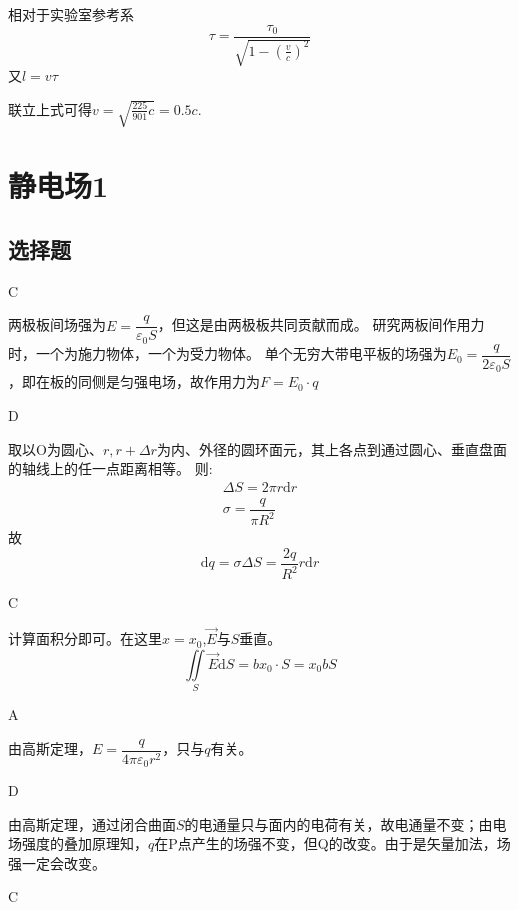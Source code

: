 \documentclass[b5paper,opensource,sourcefont,parskip]{qyxf-book}
\newcommand{\di}[1]{\mathrm{d}#1}
\begin{document}
\solve
相对于实验室参考系
\begin{equation*}
\tau=\frac{\tau_0}{\sqrt{1-(\frac{v}{c})^2}}
\end{equation*}
又$l=v\tau$

联立上式可得$v=\sqrt{\frac{225}{901}c}=0.5c$.

\chapter{静电场1}
\section{选择题}

C

\solve
两极板间场强为$E=\dfrac{q}{\varepsilon_0S}$，但这是由两极板共同贡献而成。
研究两板间作用力时，一个为施力物体，一个为受力物体。
单个无穷大带电平板的场强为$E_0=\dfrac{q}{2\varepsilon_0S}$，即在板的同侧是匀强电场，故作用力为$F=E_0\cdot q$

D

\solve
取以O为圆心、$r,r+\Delta r$为内、外径的圆环面元，其上各点到通过圆心、垂直盘面的轴线上的任一点距离相等。
则:
\begin{gather*}
	\Delta S=2\pi r\di{r}\\
	\sigma=\dfrac{q}{\pi R^2}
\end{gather*}
故
\begin{equation*}
	\di{q}=\sigma \Delta S=\dfrac{2q}{R^2}r\di{r}
\end{equation*}

C

\solve
计算面积分即可。在这里$x=x_0$,$\vec{E}$与$S$垂直。
\begin{equation*}
	 \iint\limits_S \vec{E}\di{S}=bx_0\cdot S=x_0bS
\end{equation*}

A

\solve
由高斯定理，$E=\dfrac{q}{4\pi\varepsilon_0 r^2}$，只与$q$有关。

D

\solve
由高斯定理，通过闭合曲面$S$的电通量只与面内的电荷有关，故电通量不变；由电场强度的叠加原理知，$q$在P点产生的场强不变，但Q的改变。由于是矢量加法，场强一定会改变。

C
\end{document}
